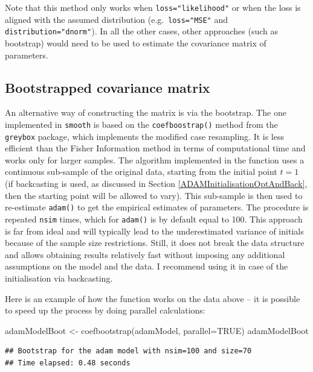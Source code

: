 \documentclass[
]{book}
\newenvironment{Shaded}{\begin{snugshade}}{\end{snugshade}}
\newcommand{\AttributeTok}[1]{\textcolor[rgb]{0.77,0.63,0.00}{#1}}
\newcommand{\ConstantTok}[1]{\textcolor[rgb]{0.00,0.00,0.00}{#1}}
\newcommand{\FunctionTok}[1]{\textcolor[rgb]{0.00,0.00,0.00}{#1}}
\newcommand{\NormalTok}[1]{#1}
\newcommand{\OtherTok}[1]{\textcolor[rgb]{0.56,0.35,0.01}{#1}}
\theoremstyle{definition}
\theoremstyle{definition}
\theoremstyle{definition}
\theoremstyle{definition}
\theoremstyle{remark}
\begin{document}
Note that this method only works when \texttt{loss="likelihood"} or when the loss is aligned with the assumed distribution (e.g.~\texttt{loss="MSE"} and \texttt{distribution="dnorm"}). In all the other cases, other approaches (such as bootstrap) would need to be used to estimate the covariance matrix of parameters.

\hypertarget{bootstrapped-covariance-matrix}{%
\subsection{Bootstrapped covariance matrix}\label{bootstrapped-covariance-matrix}}

An alternative way of constructing the matrix is via the bootstrap. The one implemented in \texttt{smooth} is based on the \texttt{coefboostrap()} method from the \texttt{greybox} package, which implements the modified case resampling. It is less efficient than the Fisher Information method in terms of computational time and works only for larger samples. The algorithm implemented in the function uses a continuous sub-sample of the original data, starting from the initial point \(t=1\) (if backcasting is used, as discussed in Section \ref{ADAMInitialisationOptAndBack}, then the starting point will be allowed to vary). This sub-sample is then used to re-estimate \texttt{adam()} to get the empirical estimates of parameters. The procedure is repeated \texttt{nsim} times, which for \texttt{adam()} is by default equal to 100. This approach is far from ideal and will typically lead to the underestimated variance of initials because of the sample size restrictions. Still, it does not break the data structure and allows obtaining results relatively fast without imposing any additional assumptions on the model and the data. I recommend using it in case of the initialisation via backcasting.

Here is an example of how the function works on the data above -- it is possible to speed up the process by doing parallel calculations:

\begin{Shaded}
\begin{Highlighting}[]
\NormalTok{adamModelBoot }\OtherTok{\textless{}{-}} \FunctionTok{coefbootstrap}\NormalTok{(adamModel, }\AttributeTok{parallel=}\ConstantTok{TRUE}\NormalTok{)}
\NormalTok{adamModelBoot}
\end{Highlighting}
\end{Shaded}

\begin{verbatim}
## Bootstrap for the adam model with nsim=100 and size=70
## Time elapsed: 0.48 seconds
\end{verbatim}
\end{document}
